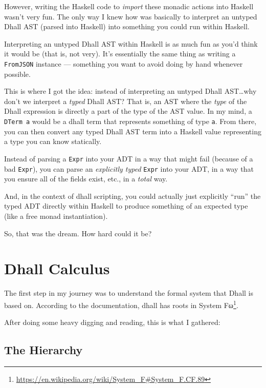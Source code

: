 \documentclass[]{article}
\renewcommand{\href}[2]{#2\footnote{\url{#1}}}
\begin{document}
However, writing the Haskell code to \emph{import} these monadic actions into
Haskell wasn't very fun. The only way I knew how was basically to interpret an
untyped Dhall AST (parsed into Haskell) into something you could run within
Haskell.

Interpreting an untyped Dhall AST within Haskell is as much fun as you'd think
it would be (that is, not very). It's essentially the same thing as writing a
\texttt{FromJSON} instance --- something you want to avoid doing by hand
whenever possible.

This is where I got the idea: instead of interpreting an untyped Dhall
AST\ldots{}why don't we interpret a \emph{typed} Dhall AST? That is, an AST
where the \emph{type} of the Dhall expression is directly a part of the type of
the AST value. In my mind, a \texttt{DTerm\ a} would be a dhall term that
represents something of type \texttt{a}. From there, you can then convert any
typed Dhall AST term into a Haskell value representing a type you can know
statically.

Instead of parsing a \texttt{Expr} into your ADT in a way that might fail
(because of a bad \texttt{Expr}), you can parse an \emph{explicitly typed}
\texttt{Expr} into your ADT, in a way that you ensure all of the fields exist,
etc., in a \emph{total} way.

And, in the context of dhall scripting, you could actually just explicitly
``run'' the typed ADT directly within Haskell to produce something of an
expected type (like a free monad instantiation).

So, that was the dream. How hard could it be?

\hypertarget{dhall-calculus}{%
\section{Dhall Calculus}\label{dhall-calculus}}

The first step in my journey was to understand the formal system that Dhall is
based on. According to the documentation, dhall has roots in
\href{https://en.wikipedia.org/wiki/System_F\#System_F.CF.89}{System Fω}.

After doing some heavy digging and reading, this is what I gathered:

\hypertarget{the-hierarchy}{%
\subsection{The Hierarchy}\label{the-hierarchy}}
\end{document}
